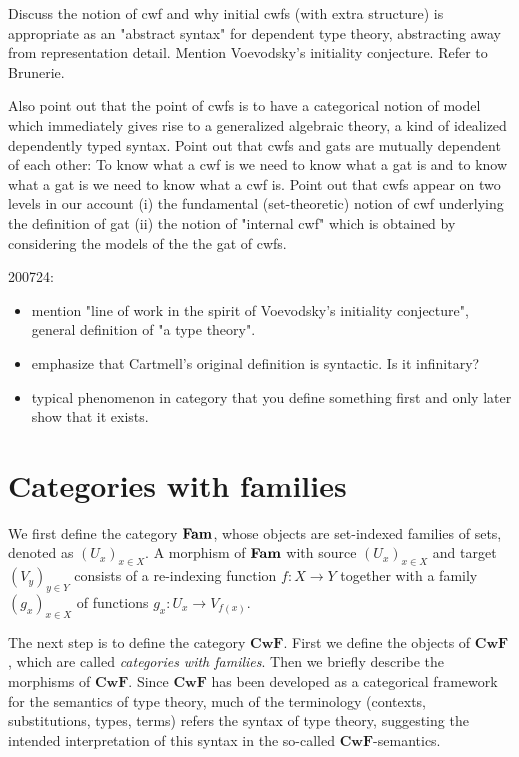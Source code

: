 \documentclass{lmcs}
\def\Cwf{\mathbf{CwF}}
\begin{document}
Discuss the notion of cwf and why initial cwfs (with extra structure) is appropriate as an "abstract syntax" for dependent type theory, abstracting away from representation detail. Mention Voevodsky's initiality conjecture. Refer to Brunerie.

Also point out that the point of cwfs is to have a categorical notion of model which immediately gives rise to a generalized algebraic theory, a kind of idealized dependently typed syntax. Point out that cwfs and gats are mutually dependent of each other: To know what a cwf is we need to know what a gat is and to know what a gat is we need to know what a cwf is. Point out that cwfs appear on two levels in our account (i) the fundamental (set-theoretic) notion of cwf underlying the definition of gat (ii) the notion of "internal cwf" which is obtained by considering the models of the the gat of cwfs.

200724: 
\begin{itemize}
\item mention "line of work in the spirit of Voevodsky's initiality conjecture", general definition of "a type theory".
\item emphasize that Cartmell's original definition is syntactic. Is it infinitary?
\item typical phenomenon in category that you define something first and only later show that it exists.
\end{itemize}

\section{Categories with families}\label{sec:def_cwf}

We first define the category $\textbf{Fam}$, whose objects are
set-indexed families of sets, denoted as $(U_x)_{x\in X}$.
A morphism of $\textbf{Fam}$ with source $(U_x)_{x\in X}$ and target $(V_y)_{y\in Y}$
consists of a re-indexing function $f: X\to Y$ together with a family
$(g_x)_{x\in X}$ of functions $g_x : U_x \to V_{f(x)}$. %

The next step is to define the category $\Cwf$. First we define the
objects of $\Cwf$, which are called \emph{categories with families}.
Then we briefly describe the morphisms of $\Cwf$. Since $\Cwf$ has 
been developed as a categorical framework for the semantics of
type theory, much of the terminology (contexts, substitutions,
types, terms) refers the syntax of type theory, 
suggesting the intended interpretation of this syntax in the 
so-called $\Cwf$-semantics.
\end{document}
